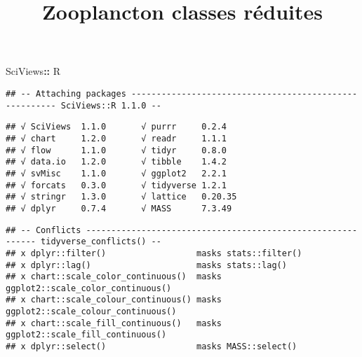 \documentclass[]{article}
\title{Zooplancton classes réduites}
\author{}
\date{}
\newenvironment{Shaded}{\begin{snugshade}}{\end{snugshade}}
\newcommand{\KeywordTok}[1]{\textcolor[rgb]{0.13,0.29,0.53}{\textbf{#1}}}
\newcommand{\DataTypeTok}[1]{\textcolor[rgb]{0.13,0.29,0.53}{#1}}
\newcommand{\StringTok}[1]{\textcolor[rgb]{0.31,0.60,0.02}{#1}}
\newcommand{\OperatorTok}[1]{\textcolor[rgb]{0.81,0.36,0.00}{\textbf{#1}}}
\newcommand{\NormalTok}[1]{#1}
\begin{document}
\maketitle

{
\setcounter{tocdepth}{2}
\tableofcontents
}
\begin{Shaded}
\begin{Highlighting}[]
\NormalTok{SciViews}\OperatorTok{::}\StringTok{ }\NormalTok{R}
\end{Highlighting}
\end{Shaded}

\begin{verbatim}
## -- Attaching packages ------------------------------------------------------- SciViews::R 1.1.0 --
\end{verbatim}

\begin{verbatim}
## √ SciViews  1.1.0       √ purrr     0.2.4  
## √ chart     1.2.0       √ readr     1.1.1  
## √ flow      1.1.0       √ tidyr     0.8.0  
## √ data.io   1.2.0       √ tibble    1.4.2  
## √ svMisc    1.1.0       √ ggplot2   2.2.1  
## √ forcats   0.3.0       √ tidyverse 1.2.1  
## √ stringr   1.3.0       √ lattice   0.20.35
## √ dplyr     0.7.4       √ MASS      7.3.49
\end{verbatim}

\begin{verbatim}
## -- Conflicts ------------------------------------------------------------ tidyverse_conflicts() --
## x dplyr::filter()                  masks stats::filter()
## x dplyr::lag()                     masks stats::lag()
## x chart::scale_color_continuous()  masks ggplot2::scale_color_continuous()
## x chart::scale_colour_continuous() masks ggplot2::scale_colour_continuous()
## x chart::scale_fill_continuous()   masks ggplot2::scale_fill_continuous()
## x dplyr::select()                  masks MASS::select()
\end{verbatim}

\begin{Shaded}
\end{Shaded}
\end{document}
